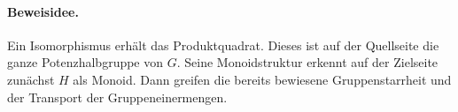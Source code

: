 \documentclass[main.tex]{subfiles}
\begin{document}
\paragraph{Beweisidee.}
Ein Isomorphismus erhält das Produktquadrat. Dieses ist auf der Quellseite
die ganze Potenzhalbgruppe von \(G\). Seine Monoidstruktur erkennt auf der
Zielseite zunächst \(H\) als Monoid. Dann greifen die bereits bewiesene
Gruppenstarrheit und der Transport der Gruppeneinermengen.

\par\noindent\begin{minipage}{\linewidth}
\end{minipage}\par
\end{document}
